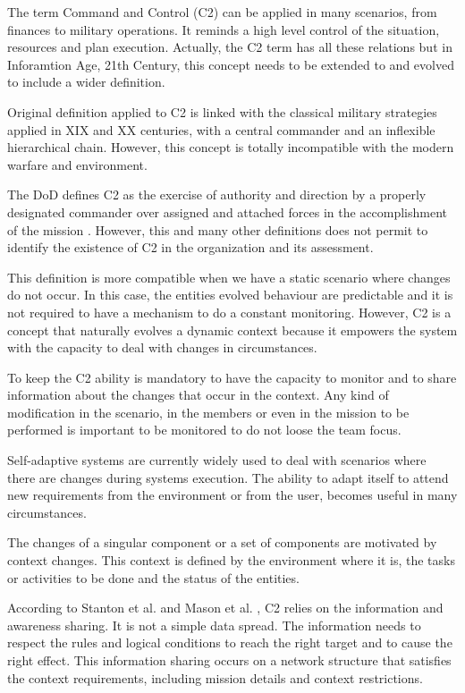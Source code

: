 
The term Command and Control (C2) can be applied in many scenarios, from finances to military operations. It reminds a high level control of the situation, resources and plan execution. Actually, the C2 term has all these relations but in Inforamtion Age, 21th Century, this concept needs to be extended to and evolved to include a wider definition.

Original definition applied to C2 is linked with the classical military strategies applied in XIX and XX centuries, with a central commander and an inflexible hierarchical chain. However, this concept is totally incompatible with the modern warfare and environment.

The DoD defines C2 as the exercise of authority and direction by a properly designated commander over assigned and attached forces in the accomplishment of the mission \cite{States.2019}. However, this and many other definitions does not permit to identify the existence of C2 in the organization and its assessment.

This definition is more compatible when we have a static scenario where changes do not occur. In this case, the entities evolved behaviour are predictable and it is not required to have a mechanism to do a constant monitoring. However, C2 is a concept that naturally evolves a dynamic context because it empowers the system with the capacity to deal with changes in circumstances.

To keep the C2 ability is mandatory to have the capacity to monitor and to share information about the changes that occur in the context. Any kind of modification in the scenario, in the members or even in the mission to be performed is important to be monitored to do not loose the team focus.

Self-adaptive systems are currently widely used to deal with scenarios where there are changes during systems execution. The ability to adapt itself to attend new requirements from the environment or from the user, becomes useful in many circumstances.

The changes of a singular component or a set of components are motivated by context changes. This context is defined by the environment where it is, the tasks or activities to be done and the status of the entities.

According to Stanton et al. \cite{} and  Mason et al. \cite{}, C2 relies on the information and awareness sharing. It is not a simple data spread. The information needs to respect the rules and logical conditions to reach the right target and to cause the right effect. This information sharing occurs on a network structure that satisfies the context requirements, including mission details and context restrictions.

